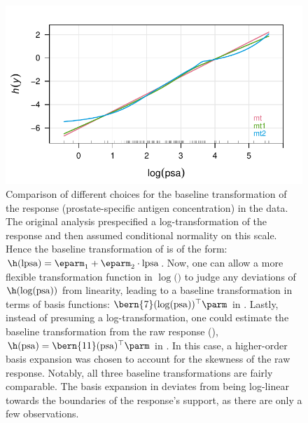 \begin{figure}[!ht]
\centering 
\includegraphics{BH_Linear5-1} 
\caption{Comparison of different choices for the baseline transformation of the
response (prostate-specific antigen concentration) in the  data.
The original analysis prespecified a log-transformation of the response and then
assumed conditional normality on this scale. Hence the baseline transformation
of  is of the form: $\h(\mathrm{lpsa}) = \eparm_1 + \eparm_2 \cdot
\mathrm{lpsa}$. Now, one can allow a more flexible transformation function in
$\log($$)$ to judge any deviations of $\h(\log(\mathrm{psa}))$ from
linearity, leading to a baseline transformation in terms of basis functions:
$\bern{7}(\log(\mathrm{psa}))^\top \parm$ in . Lastly, instead of
presuming a log-transformation, one could estimate the baseline transformation
from the raw response (), \ie $\h(\mathrm{psa}) = \bern{11}
(\mathrm{psa})^\top \parm$ in . In this case, a higher-order basis
expansion was chosen to account for the skewness of the raw response. Notably,
all three baseline transformations are fairly comparable. The basis expansion
in  deviates from being log-linear towards the boundaries of the
response's support, as there are only a few observations.}
\label{fig:Prostate_trafos}
\end{figure}

